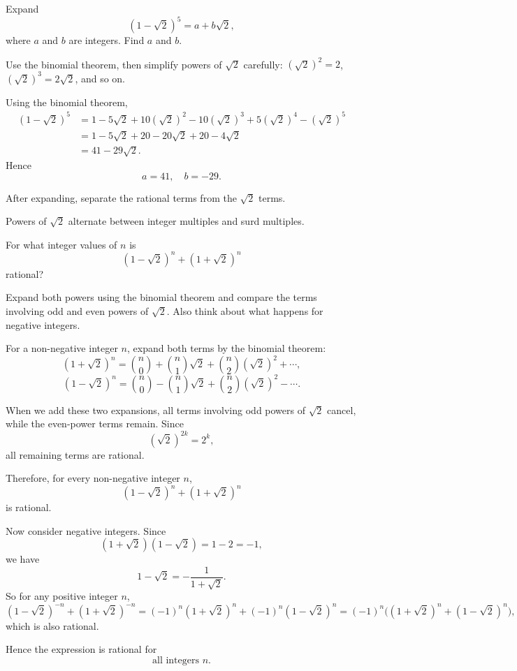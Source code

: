 \begin{problem}
Expand
\[
(1-\sqrt{2})^5=a+b\sqrt{2},
\]
where $a$ and $b$ are integers. Find $a$ and $b$.
\end{problem}

\begin{hint}
Use the binomial theorem, then simplify powers of $\sqrt{2}$ carefully: $(\sqrt{2})^2=2$, $(\sqrt{2})^3=2\sqrt{2}$, and so on.
\end{hint}

\begin{solution}
Using the binomial theorem,
\begin{align*}
(1-\sqrt{2})^5
&= 1 - 5\sqrt{2} + 10(\sqrt{2})^2 - 10(\sqrt{2})^3 + 5(\sqrt{2})^4 - (\sqrt{2})^5 \\
&= 1 - 5\sqrt{2} + 20 - 20\sqrt{2} + 20 - 4\sqrt{2} \\
&= 41 - 29\sqrt{2}.
\end{align*}
Hence
\[
\boxed{a=41,\quad b=-29}.
\]
\end{solution}

\begin{takeaways}
\item After expanding, separate the rational terms from the $\sqrt{2}$ terms.
\item Powers of $\sqrt{2}$ alternate between integer multiples and surd multiples.
\end{takeaways}

\begin{problem}
For what integer values of $n$ is
\[
(1-\sqrt{2})^n+(1+\sqrt{2})^n
\]
rational?
\end{problem}

\begin{hint}
Expand both powers using the binomial theorem and compare the terms involving odd and even powers of $\sqrt{2}$. Also think about what happens for negative integers.
\end{hint}

\begin{solution}
For a non-negative integer $n$, expand both terms by the binomial theorem:
\[
(1+\sqrt{2})^n=\binom{n}{0}+\binom{n}{1}\sqrt{2}+\binom{n}{2}(\sqrt{2})^2+\cdots,
\]
\[
(1-\sqrt{2})^n=\binom{n}{0}-\binom{n}{1}\sqrt{2}+\binom{n}{2}(\sqrt{2})^2-\cdots.
\]

When we add these two expansions, all terms involving odd powers of $\sqrt{2}$ cancel, while the even-power terms remain. Since
\[
(\sqrt{2})^{2k}=2^k,
\]
all remaining terms are rational.

Therefore, for every non-negative integer $n$,
\[
(1-\sqrt{2})^n+(1+\sqrt{2})^n
\]
is rational.

Now consider negative integers. Since
\[
(1+\sqrt{2})(1-\sqrt{2})=1-2=-1,
\]
we have
\[
1-\sqrt{2}=-\frac{1}{1+\sqrt{2}}.
\]
So for any positive integer $n$,
\[
(1-\sqrt{2})^{-n}+(1+\sqrt{2})^{-n}
=(-1)^n(1+\sqrt{2})^n+(-1)^n(1-\sqrt{2})^n
=(-1)^n\Big((1+\sqrt{2})^n+(1-\sqrt{2})^n\Big),
\]
which is also rational.

Hence the expression is rational for
\[
\boxed{\text{all integers } n.}
\]
\end{solution}


